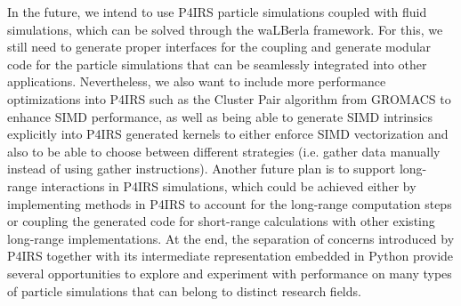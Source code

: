 \documentclass[Afour,sageh,times]{sagej}
\begin{document}
In the future, we intend to use P4IRS particle simulations coupled with fluid simulations, which can be solved through the waLBerla framework.
For this, we still need to generate proper interfaces for the coupling and generate modular code for the particle simulations that can be seamlessly integrated into other applications.
Nevertheless, we also want to include more performance optimizations into P4IRS such as the Cluster Pair algorithm from GROMACS to enhance SIMD performance, as well as being able to generate SIMD intrinsics explicitly into P4IRS generated kernels to either enforce SIMD vectorization and also to be able to choose between different strategies (i.e. gather data manually instead of using gather instructions).
Another future plan is to support long-range interactions in P4IRS simulations, which could be achieved either by implementing methods in P4IRS to account for the long-range computation steps or coupling the generated code for short-range calculations with other existing long-range implementations.
At the end, the separation of concerns introduced by P4IRS together with its intermediate representation embedded in Python provide several opportunities to explore and experiment with performance on many types of particle simulations that can belong to distinct research fields.


\end{document}
